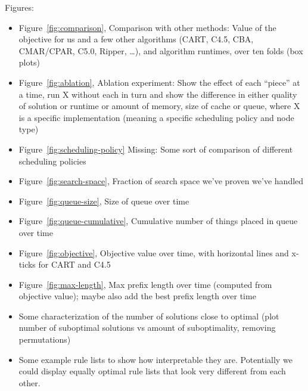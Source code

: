 Figures:
\begin{itemize}

\item Figure~\ref{fig:comparison}, Comparison with other methods:
Value of the objective for us and a few other algorithms
(CART, C4.5, CBA, CMAR/CPAR, C5.0, Ripper, \dots), and algorithm runtimes,
over ten folds (box plots)

\item Figure~\ref{fig:ablation},  Ablation experiment:
Show the effect of each ``piece'' at a time,
run X without each in turn and show the difference in either
quality of solution or runtime or amount of memory, size of cache or queue,
where X is a specific implementation
(meaning a specific scheduling policy and node type)

\item Figure~\ref{fig:scheduling-policy}
Missing:  Some sort of comparison of different scheduling policies

\item Figure~\ref{fig:search-space},
Fraction of search space we've proven we've handled

\item Figure~\ref{fig:queue-size}, Size of queue over time

\item Figure~\ref{fig:queue-cumulative},
Cumulative number of things placed in queue over time

\item Figure~\ref{fig:objective}, Objective value over time,
with horizontal lines and x-ticks for CART and C4.5

\item Figure~\ref{fig:max-length},
Max prefix length over time (computed from objective value);
maybe also add the best prefix length over time

\item Some characterization of the number of solutions close to optimal
(plot number of suboptimal solutions vs amount of suboptimality,
removing permutations)

\item Some example rule lists to show how interpretable they are.
Potentially we could display equally optimal rule lists that look
very different from each other.

\end{itemize}


